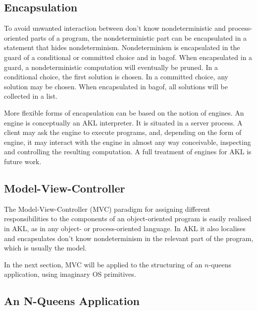 \subsection{Encapsulation}

To avoid unwanted interaction between don't know nondeterministic and
pro\-cess-oriented parts of a program, the nondeterministic part can be
encapsulated in a statement that hides nondeterminism.  Nondeterminism
is encapsulated in the guard of a conditional or committed choice and
in bagof.  When encapsulated in a guard, a nondeterministic
computation will eventually be pruned.  In a conditional choice, the
first solution is chosen.  In a committed choice, any solution may be
chosen.  When encapsulated in bagof, all solutions will be collected
in a list.

More flexible forms of encapsulation can be based on the notion of
engines.  An engine is conceptually an AKL interpreter.  It is situated
in a server process.  A client may ask the engine to execute programs,
and, depending on the form of engine, it may interact with the engine
in almost any way conceivable, inspecting and controlling the
resulting computation.  A full treatment of engines for AKL is future
work.

\subsection{Model-View-Controller}

The Model-View-Controller (MVC) paradigm for assigning different
responsibilities to the components of an object-oriented program is
easily realised in AKL, as in any object- or process-oriented
language.  In AKL it also localises and encapsulates don't know
nondeterminism in the relevant part of the program, which is usually
the model.
                                     

In the next section, MVC will be applied to the structuring of an
$n$-queens application, using imaginary OS primitives.

\subsection{An N-Queens Application}

